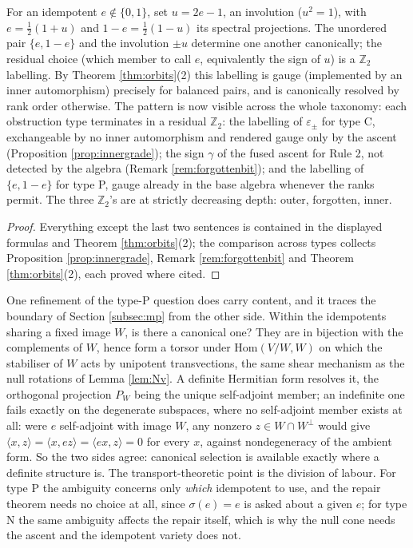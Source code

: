 \begin{proposition}\label{prop:pair}
For an idempotent $e \notin \{0,1\}$, set $u = 2e - 1$, an involution ($u^2 = 1$), with $e = \tfrac12(1+u)$ and $1 - e = \tfrac12(1-u)$ its spectral projections. The unordered pair $\{e, 1-e\}$ and the involution $\pm u$ determine one another canonically; the residual choice (which member to call $e$, equivalently the sign of $u$) is a $\mathbb{Z}_2$ labelling. By Theorem \ref{thm:orbits}(2) this labelling is gauge (implemented by an inner automorphism) precisely for balanced pairs, and is canonically resolved by rank order otherwise. The pattern is now visible across the whole taxonomy: each obstruction type terminates in a residual $\mathbb{Z}_2$: the labelling of $\varepsilon_\pm$ for type C, exchangeable by no inner automorphism and rendered gauge only by the ascent (Proposition \ref{prop:innergrade}); the sign $\gamma$ of the fused ascent for Rule 2, not detected by the algebra (Remark \ref{rem:forgottenbit}); and the labelling of $\{e, 1-e\}$ for type P, gauge already in the base algebra whenever the ranks permit. The three $\mathbb{Z}_2$'s are at strictly decreasing depth: outer, forgotten, inner.
\end{proposition}

\begin{proof}
Everything except the last two sentences is contained in the displayed formulas and Theorem \ref{thm:orbits}(2); the comparison across types collects Proposition \ref{prop:innergrade}, Remark \ref{rem:forgottenbit} and Theorem \ref{thm:orbits}(2), each proved where cited.
\end{proof}

\begin{remark}\label{rem:MPboundary}
One refinement of the type-P question does carry content, and it traces the boundary of Section \ref{subsec:mp} from the other side. Within the idempotents sharing a fixed image $W$, is there a canonical one? They are in bijection with the complements of $W$, hence form a torsor under $\mathrm{Hom}(V/W, W)$ on which the stabiliser of $W$ acts by unipotent transvections, the same shear mechanism as the null rotations of Lemma \ref{lem:Nv}. A definite Hermitian form resolves it, the orthogonal projection $P_W$ being the unique self-adjoint member; an indefinite one fails exactly on the degenerate subspaces, where no self-adjoint member exists at all: were $e$ self-adjoint with image $W$, any nonzero $z \in W \cap W^{\perp}$ would give $\langle x, z\rangle = \langle x, ez\rangle = \langle ex, z\rangle = 0$ for every $x$, against nondegeneracy of the ambient form. So the two sides agree: canonical selection is available exactly where a definite structure is. The transport-theoretic point is the division of labour. For type P the ambiguity concerns only \emph{which} idempotent to use, and the repair theorem needs no choice at all, since $\sigma(e) = e$ is asked about a given $e$; for type N the same ambiguity affects the repair itself, which is why the null cone needs the ascent and the idempotent variety does not.
\end{remark}

